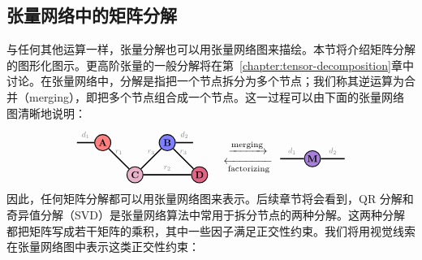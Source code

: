 \subsection{张量网络中的矩阵分解}
与任何其他运算一样，张量分解也可以用张量网络图来描绘。本节将介绍矩阵分解的图形化图示。更高阶张量的一般分解将在第~\ref{chapter:tensor-decomposition}章中讨论。在张量网络中，分解是指把一个节点拆分为多个节点；我们称其逆运算为合并（merging），即把多个节点组合成一个节点。这一过程可以由下面的张量网络图清晰地说明：
\begin{align*}
\begin{tikzpicture}[baseline=\baseline]
    \tikzset{tensor/.style = {minimum size = 0.5cm,shape = circle,thick,draw=black,inner sep = 0pt}, edge/.style = {thick,line width=.4mm},every loop/.style={}}
    \def\y{0}
    \def\x{0}
    \node[tensor,fill=red!50!white] (A) at (\x,\y){\scalebox{0.85}{$\Ab$}};
    \node[tensor,fill=blue!50!white] (B) at (\x+2,\y){\scalebox{0.85}{$\Bb$}};
    \node[tensor,fill=blue!30!red!30!white] (C) at (\x+1,\y-1){\scalebox{0.85}{$\Cb$}};
    \node[tensor,fill=red!80!blue!60!white] (D) at (\x+3,\y-1){\scalebox{0.85}{$\Db$}};
    \draw[edge](A) -- (C) node [midway,above] {\scalebox{0.7}{\dimcolor{$r_1$}}};
    \draw[edge](C) -- (D) node [midway,above] {\scalebox{0.7}{\dimcolor{$r_2$}}};
    \draw[edge](B) -- (D) node [midway,above] {\scalebox{0.7}{\dimcolor{$r_3$}}};
    \draw[edge](B) -- (C) node [midway,above] {\scalebox{0.7}{\dimcolor{$r_3$}}};
    \draw[edge](A) -- (\x-0.8,\y) node [midway,above] {\scalebox{0.7}{\dimcolor{$d_1$}}};
    \draw[edge](B) -- (\x+2.8,\y) node [midway,above] {\scalebox{0.7}{\dimcolor{$d_2$}}};
    \node[draw=none]() at (\x+4.5,\y-0.15){\scalebox{1}{$\xrightarrow[]{\text{merging}}$}};
    \node[draw=none]() at 
    (\x+4.5,\y-0.75){\scalebox{1}{$\xleftarrow[\text{factorizing}]{}$}};
    \node[tensor,fill=red!30!blue!50!white] (M) at (\x+6.5,\y-0.5){\scalebox{0.85}{$\Mb$}};
    \draw[edge](M) -- (\x+7.5,\y-0.5) node [midway,above] {\scalebox{0.7}{\dimcolor{$d_2$}}};
    \draw[edge](M) -- (\x+5.5,\y-0.5) node [midway,above] {\scalebox{0.7}{\dimcolor{$d_1$}}};
\end{tikzpicture}
\end{align*}
因此，任何矩阵分解都可以用张量网络图来表示。后续章节将会看到，QR 分解和奇异值分解（SVD）是张量网络算法中常用于拆分节点的两种分解。这两种分解都把矩阵写成若干矩阵的乘积，其中一些因子满足正交性约束。我们将用视觉线索在张量网络图中表示这类正交性约束：
